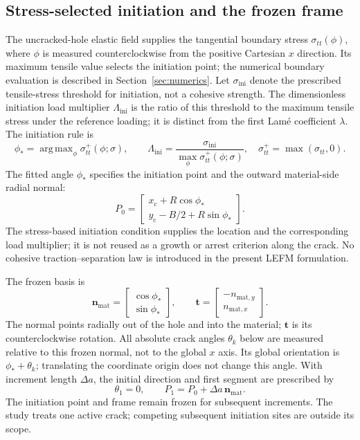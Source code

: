 \documentclass[pdflatex,sn-mathphys-num]{sn-jnl}
\begin{document}
\subsection{Stress-selected initiation and the frozen frame}
The uncracked-hole elastic field supplies the tangential boundary stress
$\sigma_{tt}(\phi)$, where $\phi$ is measured counterclockwise from the
positive Cartesian $x$ direction. Its maximum tensile value selects the
initiation point; the numerical boundary evaluation is described in
Section~\ref{sec:numerics}. Let $\sigma_{\mathrm{ini}}$ denote the
prescribed tensile-stress threshold for initiation, not a cohesive
strength. The dimensionless initiation load multiplier
$\Lambda_{\mathrm{ini}}$ is the ratio of this threshold to the maximum
tensile stress under the reference loading; it is distinct from the
first Lam\'e coefficient $\lambda$. The initiation rule is
\begin{equation}
 \phi_* = \mathop{\operatorname{arg\,max}}_\phi
      \sigma_{tt}^{+}(\phi;\sigma),\qquad
 \Lambda_{\mathrm{ini}}=
      \frac{\sigma_{\mathrm{ini}}}{\max_\phi\sigma_{tt}^{+}(\phi;\sigma)},
 \quad \sigma_{tt}^{+}=\max(\sigma_{tt},0).\label{eq:initiation}
\end{equation}
The fitted angle $\phi_*$ specifies the initiation point and the
outward material-side radial normal:
\begin{equation}
 P_0=\begin{bmatrix}x_{\mathrm{c}}+R\cos\phi_*\\
                     y_{\mathrm{c}}-B/2+R\sin\phi_*
     \end{bmatrix}.
 \label{eq:mouth}
\end{equation}
The stress-based initiation condition supplies the location and the
corresponding load multiplier; it is not reused as a growth or arrest
criterion along the crack. No cohesive traction--separation law is
introduced in the present LEFM formulation.

The frozen basis is
\begin{equation}
 \bm n_{\mathrm{mat}}=
  \begin{bmatrix}\cos\phi_*\\\sin\phi_*\end{bmatrix},
 \qquad
 \bm t=\begin{bmatrix}-n_{\mathrm{mat},y}\\n_{\mathrm{mat},x}\end{bmatrix}.
 \label{eq:frozenframe}
\end{equation}
The normal points radially out of the hole and into the material; $\bm t$
is its counterclockwise rotation. All absolute crack angles $\theta_k$
below are measured relative to this frozen normal, not to the global
$x$ axis. Its global orientation is $\phi_*+\theta_k$; translating the
coordinate origin does not change this angle. With increment length $\Delta a$, the initial direction and
first segment are prescribed by
\begin{equation}
 \theta_1=0,\qquad
 P_1=P_0+\Delta a\,\bm n_{\mathrm{mat}}.\label{eq:first}
\end{equation}
The initiation point and frame remain frozen for subsequent increments.
The study treats one active crack; competing subsequent initiation sites
are outside its scope.
\end{document}
